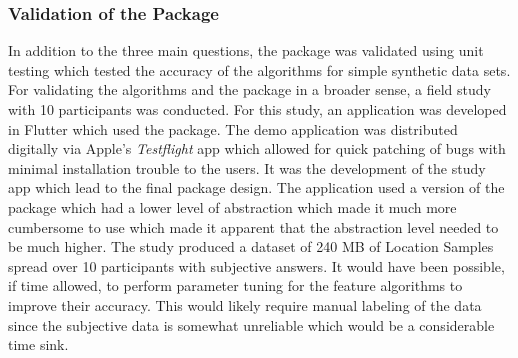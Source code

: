 \subsubsection*{Validation of the Package}
In addition to the three main questions, the package was validated using unit testing which tested the accuracy of the algorithms for simple synthetic data sets. For validating the algorithms and the package in a broader sense, a field study with 10 participants was conducted. For this study, an application was developed in Flutter which used the package. The demo application was distributed digitally via Apple's \textit{Testflight} app which allowed for quick patching of bugs with minimal installation trouble to the users. It was the development of the study app which lead to the final package design. The application used a version of the package which had a lower level of abstraction which made it much more cumbersome to use which made it apparent that the abstraction level needed to be much higher. The study produced a dataset of 240 MB of Location Samples spread over 10 participants with subjective answers. It would have been possible, if time allowed, to perform parameter tuning for the feature algorithms to improve their accuracy. This would likely require manual labeling of the data since the subjective data is somewhat unreliable which would be a considerable time sink.